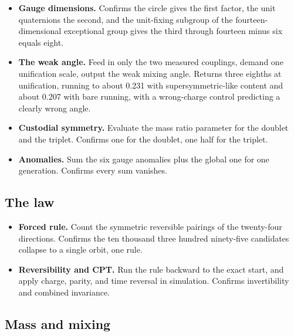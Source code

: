 \begin{itemize}
\item \textbf{Gauge dimensions.} Confirms the circle gives the first factor, the unit quaternions the second, and the unit-fixing subgroup of the fourteen-dimensional exceptional group gives the third through fourteen minus six equals eight.
\item \textbf{The weak angle.} Feed in only the two measured couplings, demand one unification scale, output the weak mixing angle. Returns three eighths at unification, running to about 0.231 with supersymmetric-like content and about 0.207 with bare running, with a wrong-charge control predicting a clearly wrong angle.
\item \textbf{Custodial symmetry.} Evaluate the mass ratio parameter for the doublet and the triplet. Confirms one for the doublet, one half for the triplet.
\item \textbf{Anomalies.} Sum the six gauge anomalies plus the global one for one generation. Confirms every sum vanishes.
\end{itemize}

\subsection*{The law}

\begin{itemize}
\item \textbf{Forced rule.} Count the symmetric reversible pairings of the twenty-four directions. Confirms the ten thousand three hundred ninety-five candidates collapse to a single orbit, one rule.
\item \textbf{Reversibility and CPT.} Run the rule backward to the exact start, and apply charge, parity, and time reversal in simulation. Confirms invertibility and combined invariance.
\end{itemize}

\subsection*{Mass and mixing}

